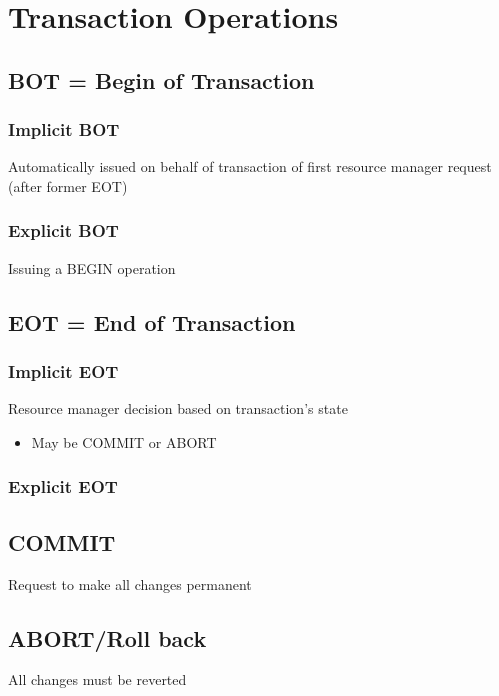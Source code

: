 	\section{Transaction Operations}
	
		\subsection{BOT = Begin of Transaction}
		
			\subsubsection{Implicit BOT}
			
				 Automatically issued on behalf of transaction of first resource manager request (after former EOT) 
				
			\subsubsection{Explicit BOT}
			
				Issuing a BEGIN operation
		
		\subsection{EOT = End of Transaction}
		
			\subsubsection{Implicit EOT}
			
				Resource manager decision based on transaction’s state
				
				\begin{itemize}
					\item May be COMMIT or ABORT
				\end{itemize}
		
			\subsubsection{Explicit EOT}
		
		\subsection{COMMIT}
			Request to make all changes permanent
		
		\subsection{ABORT/Roll back}
			All changes must be reverted
		
